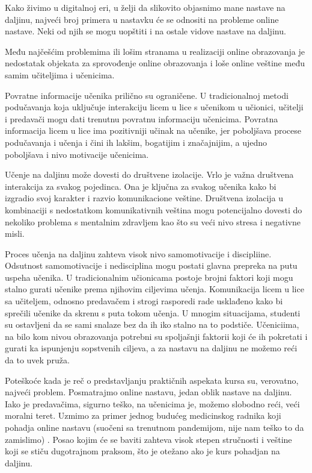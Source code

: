 \documentclass{article}
\begin{document}
Kako živimo u digitalnoj eri, u želji da slikovito objasnimo mane nastave na daljinu, najveći broj primera u nastavku će se odnositi na probleme online nastave. Neki od njih se mogu uopštiti i na ostale vidove nastave na daljinu.

Među najčešćim problemima ili lošim stranama u realizaciji online obrazovanja je nedostatak objekata za sprovođenje online obrazovanja i loše online veštine među samim učiteljima i učenicima. 

Povratne informacije učenika prilično su ograničene.
U tradicionalnoj metodi podučavanja koja uključuje interakciju licem u lice s učenikom u učionici, učitelji i predavači mogu dati trenutnu povratnu informaciju učenicima. Povratna informacija licem u lice ima pozitivniji učinak na učenike, jer poboljšava procese podučavanja i učenja i čini ih lakšim, bogatijim i značajnijim, a ujedno poboljšava i nivo motivacije učenicima.

Učenje na daljinu može dovesti do društvene izolacije. Vrlo je važna društvena interakcija za svakog pojedinca. Ona je ključna za svakog učenika kako bi izgradio svoj karakter i razvio komunikacione veštine.  Društvena izolacija u kombinaciji s nedostatkom komunikativnih veština mogu potencijalno dovesti do nekoliko problema s mentalnim zdravljem kao što su veći nivo stresa i negativne misli.

Proces učenja na daljinu zahteva visok nivo  samomotivacije i discipliine. Odsutnost samomotivacije i nedisciplina  mogu postati glavna prepreka na putu uspeha učenika. U tradicionalnim učionicama postoje brojni faktori koji mogu stalno gurati učenike prema njihovim ciljevima učenja. Komunikacija licem u lice sa učiteljem, odnosno predavačem i strogi rasporedi rade usklađeno kako bi sprečili učenike da skrenu s puta tokom učenja. U mnogim situacijama, studenti su ostavljeni da se sami snalaze bez da ih iko stalno na to podstiče. Učeniciima, na bilo kom nivou obrazovanja potrebni su spoljašnji faktorii koji će ih pokretati i gurati ka ispunjenju sopstvenih ciljeva, a za nastavu na daljinu ne možemo reći da to uvek pruža.

Poteškoće kada je reč o predstavljanju praktičnih aspekata kursa su, verovatno, najveći problem. Posmatrajmo online nastavu, jedan oblik nastave na daljinu. Iako je predavačima, sigurno teško, na učenicima je, možemo slobodno reći, veći moralni teret. Uzmimo za primer jednog budućeg medicinskog radnika koji pohadja online nastavu (suočeni sa trenutnom pandemijom, nije nam teško to da zamislimo) . Posao kojim će se baviti zahteva visok stepen stručnosti i veštine koji se stiču dugotrajnom praksom, što je otežano ako je kurs pohadjan na daljinu.
\end{document}
